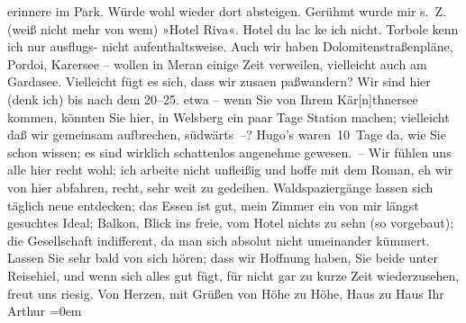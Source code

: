 \begin{ledgroupsized}[t]{13cm}
               erinnere im Park. Würde wohl wieder dort absteigen. Gerühmt wurde mir s. Z. (weiß
               nicht mehr von wem) »Hotel Riva«. Hotel du lac ke{\geminationn}
               ich nicht. Torbole kenn ich nur ausflugs- nicht
               aufenthaltsweise.\pend
           \pstart
           Auch wir haben Dolomitenstraßenpläne, Pordoi, Karersee – wollen in Meran einige Zeit
               verweilen, vielleicht auch am Gardasee.
               Vielleicht fügt es sich, dass wir zusa{\geminationm}en paßwandern?
               Wir sind hier (denk ich) bis nach dem 20–25. etwa – wenn
               Sie von Ihrem Kär{[}n{]}thnersee
               kommen, könnten Sie hier, in Welsberg ein paar
               Tage {\pb}Station machen; vielleicht daß wir gemeinsam
               aufbrechen, südwärts –?\pend
           \pstart
           Hugo’s waren 10 Tage da, wie Sie
               schon wissen; es sind wirklich schattenlos angenehme gewesen. – Wir fühlen uns alle
               hier recht wohl; ich arbeite nicht unfleißig und hoffe mit dem Roman, eh wir von hier abfahren, recht,
               sehr weit zu gedeihen. Waldspaziergänge lassen sich täglich neue entdecken; das Essen
               ist gut, mein Zimmer ein von mir längst gesuchtes Ideal; Balkon, Blick ins freie, vom
               Hotel nichts zu sehn (so vorgebaut); die Gesellschaft indifferent, da man sich
               absolut nicht umeinander kümmert.\pend
           \pstart
           Lassen Sie sehr bald von sich hören; dass wir Hoffnung haben, Sie beide unter
                  Reisehi{\geminationm}el, und wenn sich alles gut fügt, für nicht
               gar zu kurze Zeit wiederzusehen, freut uns riesig.\pend
           \pstart
           Von Herzen, mit Grüßen von Höhe zu Höhe, Haus zu Haus\pend
           \pstart
           Ihr{\\[\baselineskip]}\spacefill\mbox{Arthur}\pend
           \leftskip=0em{}
         
         \endnumbering{}\end{ledgroupsized}  \newcommand{\dateiname}{L01695}\newcommand{\titel}{Arthur Schnitzler an Richard Beer-Hofmann, 29. 7. 1907}\newcommand{\editorInnen}{Martin Anton Müller und Gerd-Hermann Susen}
      
